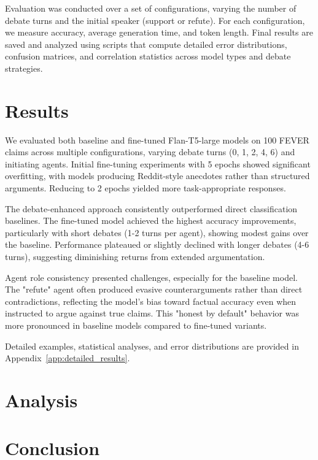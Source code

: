 \documentclass[11pt]{article}
\begin{document}
Evaluation was conducted over a set of configurations, varying the number of debate turns and the initial speaker (support or refute). For each configuration, we measure accuracy, average generation time, and token length. Final results are saved and analyzed using scripts that compute detailed error distributions, confusion matrices, and correlation statistics across model types and debate strategies.

\section{Results}

We evaluated both baseline and fine-tuned Flan-T5-large models on 100 FEVER claims across multiple configurations, varying debate turns (0, 1, 2, 4, 6) and initiating agents. Initial fine-tuning experiments with 5 epochs showed significant overfitting, with models producing Reddit-style anecdotes rather than structured arguments. Reducing to 2 epochs yielded more task-appropriate responses.

The debate-enhanced approach consistently outperformed direct classification baselines. The fine-tuned model achieved the highest accuracy improvements, particularly with short debates (1-2 turns per agent), showing modest gains over the baseline. Performance plateaued or slightly declined with longer debates (4-6 turns), suggesting diminishing returns from extended argumentation.

Agent role consistency presented challenges, especially for the baseline model. The "refute" agent often produced evasive counterarguments rather than direct contradictions, reflecting the model's bias toward factual accuracy even when instructed to argue against true claims. This "honest by default" behavior was more pronounced in baseline models compared to fine-tuned variants.

Detailed examples, statistical analyses, and error distributions are provided in Appendix~\ref{app:detailed_results}.

\section{Analysis}

\section{Conclusion}



\end{document}
